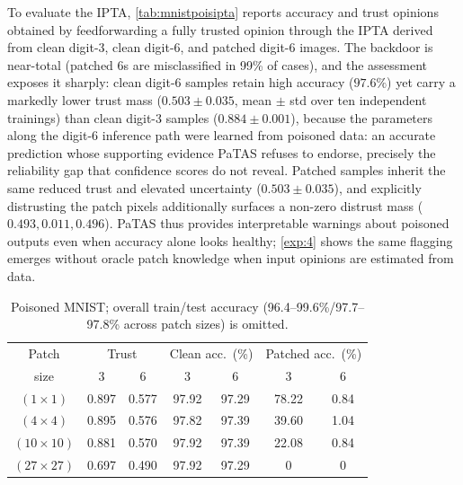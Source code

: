 To evaluate the IPTA, \cref{tab:mnistpoisipta} reports accuracy and trust opinions obtained by feedforwarding a fully trusted opinion through the IPTA derived from clean digit-3, clean digit-6, and patched digit-6 images. The backdoor is near-total (patched 6s are misclassified in 99\% of cases), and the assessment exposes it sharply: clean digit-6 samples retain high accuracy ($97.6\%$) yet carry a markedly lower trust mass ($0.503 \pm 0.035$, mean $\pm$ std over ten independent trainings) than clean digit-3 samples ($0.884 \pm 0.001$), because the parameters along the digit-6 inference path were learned from poisoned data: an accurate prediction whose supporting evidence PaTAS refuses to endorse, precisely the reliability gap that confidence scores do not reveal. Patched samples inherit the same reduced trust and elevated uncertainty ($0.503 \pm 0.035$), and explicitly distrusting the patch pixels additionally surfaces a non-zero distrust mass ($0.493, 0.011, 0.496$). PaTAS thus provides interpretable warnings about poisoned outputs even when accuracy alone looks healthy; \cref{exp:4} shows the same flagging emerges without oracle patch knowledge when input opinions are estimated from data.

\begin{table}[ht]
\centering\footnotesize
\setlength{\tabcolsep}{4pt}
\begin{tabular}{ccccccc}
\hline
Patch & \multicolumn{2}{c}{Trust} & \multicolumn{2}{c}{Clean acc.\ (\%)} & \multicolumn{2}{c}{Patched acc.\ (\%)} \\
size & 3 & 6 & 3 & 6 & 3 & 6 \\
\hline
\((1 \times 1)\) & 0.897 & 0.577 & 97.92 & 97.29 & 78.22 & 0.84 \\
\((4 \times 4)\) & 0.895 & 0.576 & 97.82 & 97.39 & 39.60 & 1.04 \\
\((10 \times 10)\) & 0.881 & 0.570 & 97.92 & 97.39 & 22.08 & 0.84 \\
\((27 \times 27)\) & 0.697 & 0.490 & 97.92 & 97.29 & 0 & 0 \\
\hline
\end{tabular}
\caption{Poisoned MNIST; overall train/test accuracy (96.4--99.6\%/97.7--97.8\% across patch sizes) is omitted.}
\label{tab:mnistpois}
\end{table}

